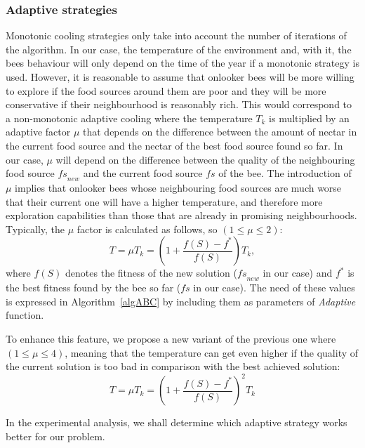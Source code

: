 \documentclass[icae]{iosart2x}
\newcommand{\reviewed}[1]{#1} %
\begin{document}
\subsubsection{Adaptive strategies}\label{subsec:adaptive}
Monotonic cooling strategies only take into account the number of iterations of the algorithm. In our case, the temperature of the environment \reviewed{and, with it, the bees behaviour will only depend on the time of the year if a monotonic strategy is used}. However, it is reasonable to assume that onlooker bees will be more willing to explore if the food sources around them are poor and they will be more conservative if their neighbourhood is \reviewed{reasonably rich. This would correspond to a non-monotonic adaptive cooling where the temperature $T_k$ is multiplied by an adaptive factor $\mu$ that depends on the difference between the amount of nectar in the current food source and the nectar of the best food source found so far. In our case, $\mu$ will depend on the difference between the quality of the neighbouring food source $\mathit{fs}_{new}$ and the current food source $\mathit{fs}$ of the bee}. The introduction of $\mu$ implies that onlooker bees whose neighbouring food sources are much worse that their current one will have a higher temperature, and therefore more exploration capabilities than those that are already in promising neighbourhoods. Typically, the $\mu$ factor is calculated as follows, so ${(1 \leq \mu \leq 2)}$:
\begin{equation}\label{eq:Adaptive}
T = \mu T_{k} = (1+\frac{f(S) - f^*}{f(S)})T_{k},
\end{equation}
where $f(S)$ denotes the fitness of the new solution ($\mathit{fs}_{new}$ in our case) and $f^*$ is the best fitness found by the bee so far ($\mathit{fs}$ in our case). \reviewed{The need of these values is expressed in Algorithm~\ref{algABC} by including them as parameters of \textit{Adaptive} function.}

To enhance this feature, we propose a new variant of the previous one where ${(1 \leq \mu \leq 4)}$, meaning that the temperature can get even higher if the quality of the current solution is too bad in comparison with the best achieved solution:
\begin{equation}\label{eq:Quadratic}
T = \mu T_{k} = (1+\frac{f(S) - f^*}{f(S)})^2 T_{k}
\end{equation}

\reviewed{In the experimental analysis, we shall determine which adaptive strategy works better for our problem.}
\end{document}
